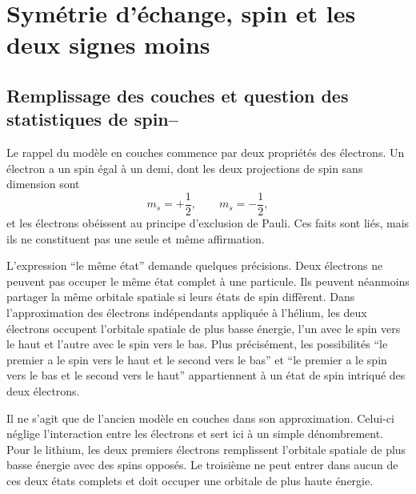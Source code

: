 \chapter{Symétrie d’échange, spin et les deux signes moins}

\section{Remplissage des couches et question des statistiques de spin--}

Le rappel du modèle en couches commence par deux propriétés des électrons. Un électron a un spin égal à un demi, dont les deux projections de spin sans dimension sont
\begin{equation}
m_s=+\frac12,
\qquad
m_s=-\frac12,
\end{equation}
et les électrons obéissent au principe d’exclusion de Pauli. Ces faits sont liés, mais ils ne constituent pas une seule et même affirmation.

L’expression ``le même état'' demande quelques précisions. Deux électrons ne peuvent pas occuper le même état complet à une particule. Ils peuvent néanmoins partager la même orbitale spatiale si leurs états de spin diffèrent. Dans l’approximation des électrons indépendants appliquée à l’hélium, les deux électrons occupent l’orbitale spatiale de plus basse énergie, l’un avec le spin vers le haut et l’autre avec le spin vers le bas. Plus précisément, les possibilités ``le premier a le spin vers le haut et le second vers le bas'' et ``le premier a le spin vers le bas et le second vers le haut'' appartiennent à un état de spin intriqué des deux électrons.

Il ne s’agit que de l’ancien modèle en couches dans son approximation. Celui-ci néglige l’interaction entre les électrons et sert ici à un simple dénombrement. Pour le lithium, les deux premiers électrons remplissent l’orbitale spatiale de plus basse énergie avec des spins opposés. Le troisième ne peut entrer dans aucun de ces deux états complets et doit occuper une orbitale de plus haute énergie.

